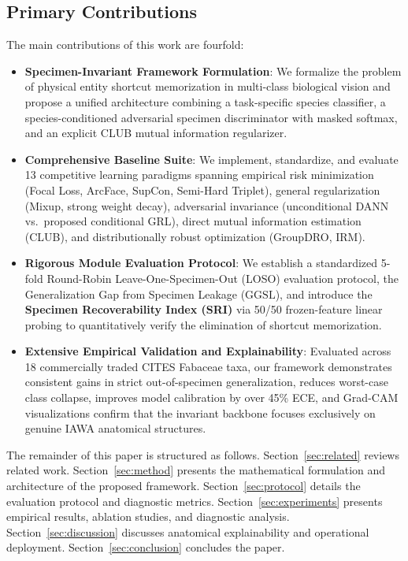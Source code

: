 \documentclass[a4paper,fleqn]{cas-sc}
\begin{document}
\subsection{Primary Contributions}
The main contributions of this work are fourfold:
\begin{itemize}
    \item \textbf{Specimen-Invariant Framework Formulation}: We formalize the problem of physical entity shortcut memorization in multi-class biological vision and propose a unified architecture combining a task-specific species classifier, a species-conditioned adversarial specimen discriminator with masked softmax, and an explicit CLUB mutual information regularizer.
    \item \textbf{Comprehensive Baseline Suite}: We implement, standardize, and evaluate 13 competitive learning paradigms spanning empirical risk minimization (Focal Loss, ArcFace, SupCon, Semi-Hard Triplet), general regularization (Mixup, strong weight decay), adversarial invariance (unconditional DANN vs.\ proposed conditional GRL), direct mutual information estimation (CLUB), and distributionally robust optimization (GroupDRO, IRM).
    \item \textbf{Rigorous Module Evaluation Protocol}: We establish a standardized 5-fold Round-Robin Leave-One-Specimen-Out (LOSO) evaluation protocol, the Generalization Gap from Specimen Leakage ($\mathrm{GGSL}$), and introduce the \textbf{Specimen Recoverability Index (SRI)} via 50/50 frozen-feature linear probing to quantitatively verify the elimination of shortcut memorization.
    \item \textbf{Extensive Empirical Validation and Explainability}: Evaluated across 18 commercially traded CITES Fabaceae taxa, our framework demonstrates consistent gains in strict out-of-specimen generalization, reduces worst-case class collapse, improves model calibration by over 45\% ECE, and Grad-CAM visualizations confirm that the invariant backbone focuses exclusively on genuine IAWA anatomical structures.
\end{itemize}

The remainder of this paper is structured as follows. Section~\ref{sec:related} reviews related work. Section~\ref{sec:method} presents the mathematical formulation and architecture of the proposed framework. Section~\ref{sec:protocol} details the evaluation protocol and diagnostic metrics. Section~\ref{sec:experiments} presents empirical results, ablation studies, and diagnostic analysis. Section~\ref{sec:discussion} discusses anatomical explainability and operational deployment. Section~\ref{sec:conclusion} concludes the paper.
\end{document}
